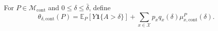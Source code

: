 For \(P\in\mathcal M_{\mathrm{cont}}\) and \(0\leq\delta\leq\bar\delta\), define
\[
 \theta_{\delta,\mathrm{cont}}(P)
 =\mathbb E_P[Y\mathbf 1\{A>\delta\}]
 +\sum_{x\in\mathcal X}p_xq_x(\delta)\mu_{x,\mathrm{cont}}^P(\delta).
\]